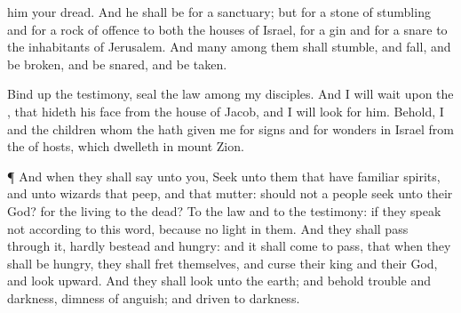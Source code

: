 {{} him
{} your
dread.
And he shall be for a
sanctuary; but for a
stone of
stumbling and for a
rock of
offence to
both the
houses of
Israel, for a
gin and for a
snare to the
inhabitants of
Jerusalem.
And
many among them shall
stumble, and
fall, and be
broken, and be
snared, and be
taken.
\par }{\PP {}Bind
up the
testimony,
seal the
law among my
disciples.
And I will
wait upon the
{}, that
hideth his
face from the
house of
Jacob, and I will
look for him.
Behold, I and the
children whom the
{} hath
given me
{} for
signs and for
wonders in
Israel from the
{} of
hosts, which
dwelleth in
mount
Zion.
\par }{\PP {}¶ And when they shall
say unto you,
Seek unto them that have familiar
spirits, and unto
wizards that
peep, and that
mutter: should not a
people
seek unto their
God? for the
living to the
dead?
To the
law and to the
testimony: if they
speak not according to this
word,
{} because
{} no
light in them.
And they shall
pass through it, hardly
bestead and
hungry: and it shall come to pass, that when they shall be
hungry, they shall
fret themselves, and
curse their
king and their
God, and
look
upward.
And they shall
look unto the
earth; and behold
trouble and
darkness,
dimness of
anguish; and
{}
driven to
darkness.

}
